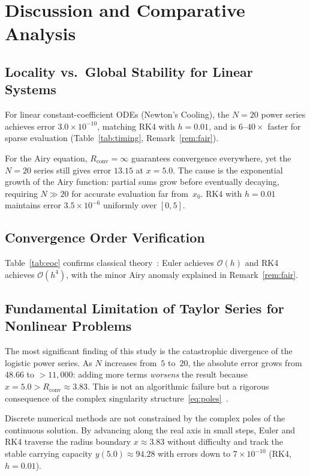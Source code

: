 \documentclass[12pt,a4paper]{article}
\theoremstyle{definition}
\theoremstyle{remark}
\newcommand{\Rconv}{R_{\mathrm{conv}}}
\newcommand{\OO}{\mathcal{O}}
\begin{document}
\section{Discussion and Comparative Analysis}
\label{sec:analysis}

\subsection{Locality vs.\ Global Stability for Linear Systems}

For linear constant-coefficient ODEs (Newton's Cooling), the
$N = 20$ power series achieves error $3.0 \times 10^{-10}$, matching
RK4 with $h = 0.01$, and is $6$--$40\times$ faster for sparse
evaluation (Table~\ref{tab:timing}, Remark~\ref{rem:fair}).

For the Airy equation, $\Rconv = \infty$ guarantees convergence
everywhere, yet the $N = 20$ series still gives error $13.15$ at
$x = 5.0$.  The cause is the exponential growth of the Airy function:
partial sums grow before eventually decaying, requiring $N \gg 20$
for accurate evaluation far from~$x_0$.  RK4 with $h = 0.01$
maintains error $3.5 \times 10^{-6}$ uniformly over $[0, 5]$.

\subsection{Convergence Order Verification}

Table~\ref{tab:eoc} confirms classical theory~\cite{butcher2016}:
Euler achieves $\OO(h)$ and RK4 achieves $\OO(h^4)$, with the
minor Airy anomaly explained in Remark~\ref{rem:fair}.

\subsection{Fundamental Limitation of Taylor Series for
  Nonlinear Problems}

The most significant finding of this study is the catastrophic
divergence of the logistic power series.  As $N$ increases from~$5$
to~$20$, the absolute error grows from $48.66$ to $>11{,}000$:
adding more terms \emph{worsens} the result because $x = 5.0 >
\Rconv \approx 3.83$.  This is not an algorithmic failure but a
rigorous consequence of the complex singularity
structure~\eqref{eq:poles}~\cite{coddington1955}.

Discrete numerical methods are not constrained by the complex poles of
the continuous solution.  By advancing along the real axis in small
steps, Euler and RK4 traverse the radius boundary
$x \approx 3.83$ without difficulty and track the stable carrying
capacity $y(5.0) \approx 94.28$ with errors down to $7 \times 10^{-10}$
(RK4, $h = 0.01$).
\end{document}
